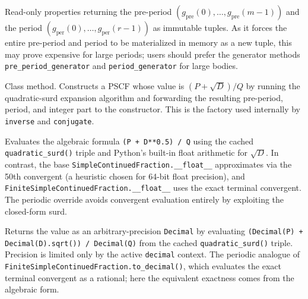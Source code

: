 \begin{description}[leftmargin=2em, style=nextline]
  \item[\texttt{non\_repeating\_part}, \texttt{period}]
    Read-only properties returning the pre-period
    $(g_{\mathrm{pre}}(0),\ldots,g_{\mathrm{pre}}(m-1))$ and the period
    $(g_{\mathrm{per}}(0),\ldots,g_{\mathrm{per}}(r-1))$ as immutable
    tuples. As it forces the entire pre-period and period to be 
    materialized in memory as a new tuple, this may prove expensive for large periods; 
    users should prefer the generator methods \texttt{pre\_period\_generator} and 
    \texttt{period\_generator} for large bodies.

  \item[\texttt{from\_quadratic\_surd(P, Q, D)}]
    Class method.  Constructs a PSCF whose value is $(P + \sqrt{D})/Q$ by
    running the quadratic-surd expansion algorithm and forwarding the
    resulting pre-period, period, and integer part to the constructor.
    This is the factory used internally by \texttt{inverse} and
    \texttt{conjugate}.

  \item[\texttt{\_\_float\_\_} (override)]
    Evaluates the algebraic formula \texttt{(P + D**0.5) / Q} using the
    cached \texttt{quadratic\_surd()} triple and Python's built-in float
    arithmetic for $\sqrt{D}$.  In contrast, the base
    \texttt{SimpleContinuedFraction.\_\_float\_\_} approximates via the
    50th convergent (a heuristic chosen for 64-bit float precision), and
    \texttt{FiniteSimpleContinuedFraction.\_\_float\_\_} uses the exact
    terminal convergent.  The periodic override avoids convergent
    evaluation entirely by exploiting the closed-form surd.

  \item[\texttt{as\_decimal()}]
    Returns the value as an arbitrary-precision \texttt{Decimal} by
    evaluating \texttt{(Decimal(P) + Decimal(D).sqrt()) / Decimal(Q)}
    from the cached \texttt{quadratic\_surd()} triple.  Precision is
    limited only by the active \texttt{decimal} context.  The periodic
    analogue of \texttt{FiniteSimpleContinuedFraction.to\_decimal()},
    which evaluates the exact terminal convergent as a rational; here the
    equivalent exactness comes from the algebraic form.
\end{description}

